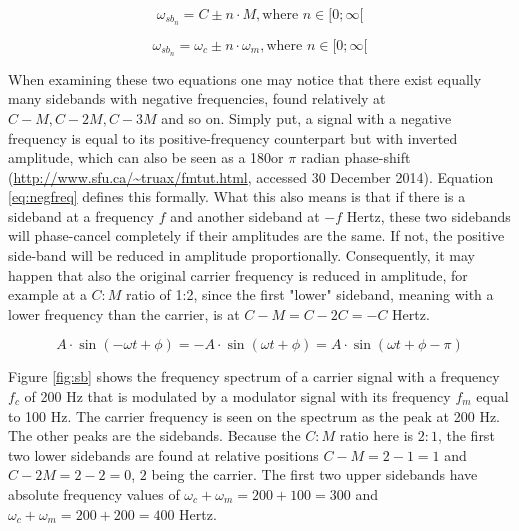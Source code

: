\documentclass[12pt,twoside]{report}
\begin{document}
\begin{equation}
  \omega_{{sb}_{n}} = C \pm n \cdot M, \text{where } n \in [0;\infty[
  \label{eq:sbcm}
\end{equation}

\begin{equation}
  \omega_{{sb}_{n}} = \omega_{c} \pm n \cdot \omega_{m}, \text{where } n \in [0;\infty[
  \label{eq:sbabs}
\end{equation}

\noindent When examining these two equations one may notice that there exist equally many sidebands with negative frequencies, found relatively at $C - M, C - 2M, C - 3M$ and so on. Simply put, a signal with a negative frequency is equal to its positive-frequency counterpart but with inverted amplitude, which can also be seen as a 180\degree or $\pi$ radian phase-shift (\url{http://www.sfu.ca/~truax/fmtut.html}, accessed 30 December 2014). Equation \ref{eq:negfreq} defines this formally. What this also means is that if there is a sideband at a frequency $f$ and another sideband at $-f$ Hertz, these two sidebands will phase-cancel completely if their amplitudes are the same. If not, the positive side-band will be reduced in amplitude proportionally. Consequently, it may happen that also the original carrier frequency is reduced in amplitude, for example at a $C:M$ ratio of 1:2, since the first "lower" sideband, meaning with a lower frequency than the carrier, is at $C - M = C - 2C = -C$ Hertz.

\begin{equation}
  A \cdot \sin(-\omega t + \phi) = -A \cdot \sin(\omega t + \phi) = A \cdot \sin(\omega t + \phi - \pi)
  \label{eq:negfreq}
\end{equation}

\noindent Figure \ref{fig:sb} shows the frequency spectrum of a carrier signal with a frequency $f_{c}$ of 200 Hz that is modulated by a modulator signal with its frequency $f_{m}$ equal to 100 Hz. The carrier frequency is seen on the spectrum as the peak at 200 Hz. The other peaks are the sidebands. Because the $C:M$ ratio here is $2:1$, the first two lower sidebands are found at relative positions $C-M=2-1=1$ and $C-2M=2-2=0$, $2$ being the carrier. The first two upper sidebands have absolute frequency values of $\omega_{c} + \omega_{m} = 200 + 100 = 300$ and %
$\omega_{c} +\omega_{m} = 200 + 200 = 400$ Hertz.\\
\end{document}
